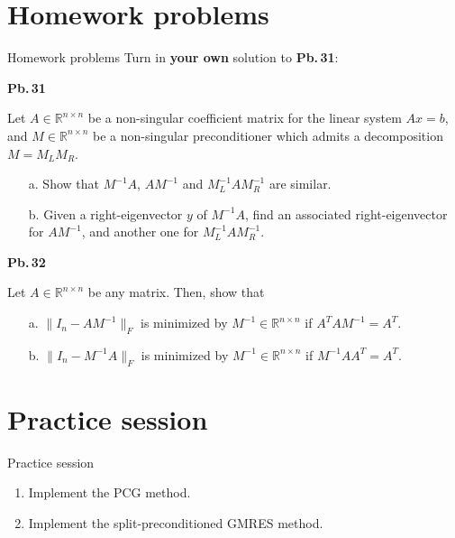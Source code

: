 \documentclass[t,usepdftitle=false]{beamer}
\begin{document}
\section{Homework problems}
\begin{frame}{Homework problems}\vspace{.1cm}
Turn in \textbf{your own} solution to \textbf{Pb.$\,$31}:\vspace{.15cm}\\
\begin{minipage}[t]{0.1\textwidth}
\textbf{Pb.$\,$31}
\end{minipage}
\begin{minipage}[t]{0.89\textwidth}
Let $A\in\mathbb{R}^{n\times n}$ be a non-singular coefficient matrix for the linear system $Ax=b$, and $M\in\mathbb{R}^{n\times n}$ be a non-singular preconditioner which admits a decomposition $M=M_LM_R$.
\begin{itemize}\normalsize
\item[a.] Show that $M^{-1}A$, $AM^{-1}$ and $M_L^{-1}AM_R^{-1}$ are similar.
\item[b.] Given a right-eigenvector $y$ of $M^{-1}A$, find an associated right-eigenvector for $AM^{-1}$, and another one for $M_L^{-1}AM_R^{-1}$.
\end{itemize}
\end{minipage}\vspace{.15cm}
\begin{minipage}[t]{0.1\textwidth}
\textbf{Pb.$\,$32}
\end{minipage}
\begin{minipage}[t]{0.89\textwidth}
Let $A\in\mathbb{R}^{n\times n}$ be any matrix. 
Then, show that
\begin{itemize}\normalsize
\item[a.] $\|I_n-AM^{-1}\|_F$ is minimized by $M^{-1}\in\mathbb{R}^{n\times n}$ if $A^TAM^{-1}=A^T$.
\item[b.] $\|I_n-M^{-1}A\|_F$ is minimized by $M^{-1}\in\mathbb{R}^{n\times n}$ if $M^{-1}AA^T=A^T$.
\end{itemize}
\end{minipage}
\end{frame}

\section{Practice session}
\begin{frame}{Practice session}
\begin{enumerate}
\item Implement the PCG method.
\item Implement the split-preconditioned GMRES method.
\end{enumerate}
\end{frame}
\end{document}
